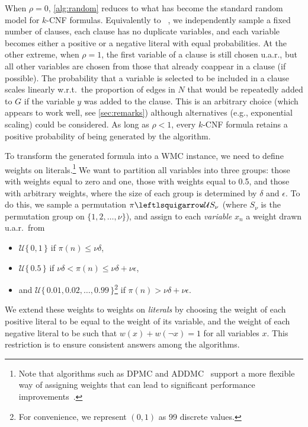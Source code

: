 \documentclass{article}
\theoremstyle{definition}
\begin{document}
When $\rho=0$, \cref{alg:random} reduces to what has become the standard random
model for $k$-CNF formulas. Equivalently to
\citeauthor{DBLP:journals/dam/FrancoP83}~,
we independently sample a fixed number of clauses, each clause has no duplicate
variables, and each variable becomes either a positive or a negative literal
with equal probabilities. At the other extreme, when $\rho = 1$, the first
variable of a clause is still chosen u.a.r., but all other variables are chosen
from those that already coappear in a clause (if possible). The probability that
a variable is selected to be included in a clause scales linearly w.r.t.\ the
proportion of edges in $N$ that would be repeatedly added to $G$ if the variable
$y$ was added to the clause. This is an arbitrary choice (which appears to work
well, see \cref{sec:remarks}) although alternatives (e.g., exponential scaling)
could be considered. As long as $\rho < 1$, every $k$-CNF formula retains a
positive probability of being generated by the algorithm.

To transform the generated formula into a \textsf{WMC} instance, we need
to define weights on literals.\footnote{Note that algorithms such as
  \textsc{DPMC} and
  \textsc{ADDMC}~\cite{DBLP:conf/aaai/DudekPV20,DBLP:conf/cp/DudekPV20} support
  a more flexible way of assigning weights that can lead to significant
  performance improvements~\cite{DBLP:conf/uai/DilkasB21,DBLP:conf/sat/DilkasB21}.} We want to partition all variables into three groups: those with weights equal to zero and one, those with weights equal to 0.5, and those with arbitrary weights, where the size of each group is determined by $\delta$ and $\epsilon$. To do this, we sample a permutation $\pi \leftlsquigarrow \mathcal{U}S_\nu$ (where $S_\nu$ is the permutation group on $\{1, 2, \dots, \nu \}$), and assign to each \emph{variable} $x_n$ a weight drawn u.a.r.\ from
\begin{itemize}
\item $\mathcal{U}\{\,0, 1\,\}$ if $\pi(n) \le \nu\delta$,
\item $\mathcal{U}\{\,0.5\,\}$ if $\nu\delta < \pi(n) \le \nu\delta +
  \nu\epsilon$,
\item and $\mathcal{U}\{\, 0.01, 0.02, \dots, 0.99 \,\}$\footnote{For
    convenience, we represent $(0, 1)$ as 99 discrete values.} if $\pi(n) >
  \nu\delta + \nu\epsilon$.
\end{itemize}
We extend these weights to weights on \emph{literals} by choosing the weight of
each positive literal to be equal to the weight of its variable, and the weight
of each negative literal to be such that $w(x) + w(\neg x) = 1$ for all
variables $x$. This restriction is to ensure consistent answers among the
algorithms.
\end{document}
